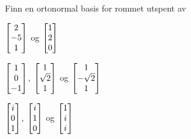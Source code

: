 %
%
%

\ifx\inkludert\undefined
{}
\fi

\begin{oppgave}
Finn en ortonormal basis for rommet utspent av%
\begin{punkt}
$\vvv{2}{-5}{1}$ og $\vvv{1}{2}{0}$ \\[4pt]
\end{punkt}

\begin{punkt}
$\vvv{1}{0}{-1}$, $\vvv{1}{\sqrt{2}}{1}$ og $\vvv{1}{-\sqrt{2}}{1}$\\[4pt]
\end{punkt}

\begin{punkt}
$\vvv{i}{0}{1}$, $\vvv{i}{1}{0}$ og $\vvv{1}{i}{i}$\\[4pt]
\end{punkt}

\end{oppgave}


